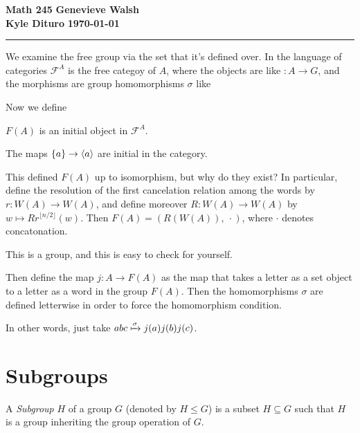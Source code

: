\documentclass[12pt, twosided]{article}
\begin{document}
\noindent \textbf{Math 245} \hfill \textbf{Genevieve Walsh } \\
\textbf{Kyle Dituro} \hfill \textbf{\today}\hrule
\vspace{.2in}

We examine the free group via the set that it's defined over. In the language of categories \(\mathscr{F}^A\) is the free categoy of \(A\), where the objects are like \(: A \to G\), and the morphisms are group homomorphisms \(\sigma\) like

\begin{center}
\end{center}

Now we define
\begin{df}
  \(F(A)\) is an initial object in \(\mathscr{F}^A\).
\end{df}

\begin{clm}
  The maps \(\left\{ a \right\} \to \langle a \rangle\) are initial in the category.
\end{clm}

This defined \(F(A)\) up to isomorphism, but why do they exist? In particular, define the resolution of the first cancelation relation among the words by \(r: W(A) \to W(A)\), and define moreover \(R:W(A) \to W(A)\) by \(w \longmapsto{R} r^{\lfloor n/2 \rfloor}(w)\). Then \(F(A) = \left(R\left(W\left(A\right)\right), \ \cdot \right)\), where \(\cdot\) denotes concatonation.

\begin{fact}
  This is a group, and this is easy to check for yourself.
\end{fact}

Then define the map \(j:A \to F(A)\) as the map that takes a letter as a set object to a letter as a word in the group \(F(A)\). Then the homomorphisms \(\sigma\) are defined letterwise in order to force the homomorphism condition.

In other words, just take \(abc \xmapsto{\sigma} j(a)j(b)j(c)\).

\section{Subgroups}

\begin{df}
  A \textit{Subgroup} \(H\) of a group \(G\) (denoted by \(H \leq G\)) is a subset \(H \subseteq G\) such that \(H\) is a group inheriting the group operation of \(G\).
\end{df}
\end{document}
